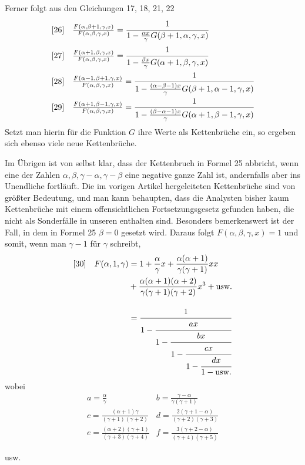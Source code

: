 Ferner folgt aus den Gleichungen 17, 18, 21, 22
\[
\begin{array}{rl}
[26]&\frac{F(\alpha,\beta+1,\gamma,x)}{F(\alpha,\beta,\gamma,x)}=\cfrac{1}{1-\frac{\alpha x}{\gamma}G(\beta+1,\alpha,\gamma,x)}\\[12pt]
[27]&\frac{F(\alpha+1,\beta,\gamma,x)}{F(\alpha,\beta,\gamma,x)}=\cfrac{1}{1-\frac{\beta x}{\gamma}G(\alpha+1,\beta,\gamma,x)}\\[12pt]
[28]&\frac{F(\alpha-1,\beta+1,\gamma,x)}{F(\alpha,\beta,\gamma,x)}=\cfrac{1}{1-\frac{(\alpha-\beta-1)x}{\gamma}G(\beta+1,\alpha-1,\gamma,x)}\\[12pt]
[29]&\frac{F(\alpha+1,\beta-1,\gamma,x)}{F(\alpha,\beta,\gamma,x)}=\cfrac{1}{1-\frac{(\beta-\alpha-1)x}{\gamma}G(\alpha+1,\beta-1,\gamma,x)}
\end{array}
\]
Setzt man hierin für die Funktion $G$ ihre Werte als Kettenbrüche ein, so ergeben sich ebenso viele neue Kettenbrüche.

Im Übrigen ist von selbst klar, dass der Kettenbruch in Formel 25 abbricht, wenn eine der Zahlen $\alpha,\beta,\gamma-\alpha,\gamma-\beta$ eine negative ganze Zahl ist, andernfalls aber ins Unendliche fortläuft.
Die im vorigen Artikel hergeleiteten Kettenbrüche sind von größter Bedeutung, und man kann behaupten, dass die Analysten bisher kaum Kettenbrüche mit einem offensichtlichen Fortsetzungsgesetz gefunden haben, die nicht als Sonderfälle in unseren enthalten sind. Besonders bemerkenswert ist der Fall, in dem in Formel 25 $\beta=0$ gesetzt wird. Daraus folgt $F(\alpha,\beta,\gamma,x)=1$ und somit, wenn man $\gamma-1$ für $\gamma$ schreibt,
\[
\begin{aligned}
{}[30]\quad F(\alpha,1,\gamma)&=1+\frac{\alpha}{\gamma}x+\frac{\alpha(\alpha+1)}{\gamma(\gamma+1)}xx\\&{}+\frac{\alpha(\alpha+1)(\alpha+2)}{\gamma(\gamma+1)(\gamma+2)}x^3+\hbox{usw.}\\[9pt]
&=\cfrac{1}{1-\cfrac{ax}{1-\cfrac{bx}{1-\cfrac{cx}{1-\cfrac{dx}{1-\hbox{usw.}}}}}}
\end{aligned}
\]
wobei
\[
\begin{array}{ll}
a=\frac{\alpha}{\gamma}&b=\frac{\gamma-\alpha}{\gamma(\gamma+1)}\\[6pt]
c=\frac{(\alpha+1)\gamma}{(\gamma+1)(\gamma+2)}&d=\frac{2(\gamma+1-\alpha)}{(\gamma+2)(\gamma+3)}\\[6pt]
e=\frac{(\alpha+2)(\gamma+1)}{(\gamma+3)(\gamma+4)}&f=\frac{3(\gamma+2-\alpha)}{(\gamma+4)(\gamma+5)}
\end{array}
\]
\begin{center}usw.\end{center}
